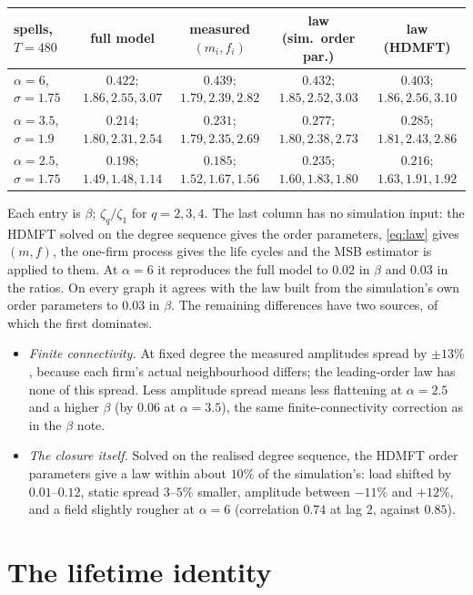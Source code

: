 \documentclass[11pt]{article}
\theoremstyle{remark}
\begin{document}
\begin{center}
\footnotesize\setlength{\tabcolsep}{3pt}
\begin{tabular}{l|c|c|c|c}
\toprule
spells, $T=480$ & full model & measured $(m_i,f_i)$ & law (sim.\ order par.) & law (HDMFT)\\
\midrule
$\alpha=6$, $\sigma=1.75$  & $0.422$; $1.86,2.55,3.07$ & $0.439$; $1.79,2.39,2.82$ & $0.432$; $1.85,2.52,3.03$ & $0.403$; $1.86,2.56,3.10$\\
$\alpha=3.5$, $\sigma=1.9$ & $0.214$; $1.80,2.31,2.54$ & $0.231$; $1.79,2.35,2.69$ & $0.277$; $1.80,2.38,2.73$ & $0.285$; $1.81,2.43,2.86$\\
$\alpha=2.5$, $\sigma=1.75$ & $0.198$; $1.49,1.48,1.14$ & $0.185$; $1.52,1.67,1.56$ & $0.235$; $1.60,1.83,1.80$ & $0.216$; $1.63,1.91,1.92$\\
\bottomrule
\end{tabular}
\end{center}

Each entry is $\beta$; $\zeta_q/\zeta_1$ for $q=2,3,4$.  The last column has no simulation input: the HDMFT solved
on the degree sequence gives the order parameters, \eqref{eq:law} gives $(m,f)$, the one-firm process gives the
life cycles and the MSB estimator is applied to them.  At $\alpha=6$ it reproduces the full model to $0.02$ in
$\beta$ and $0.03$ in the ratios.  On every graph it agrees with the law built from the simulation's own order
parameters to $0.03$ in $\beta$.  The remaining differences have two sources, of which the first dominates.
\begin{itemize}
  \item \emph{Finite connectivity.}  At fixed degree the measured amplitudes spread by $\pm13\%$, because each
        firm's actual neighbourhood differs; the leading-order law has none of this spread.  Less amplitude spread
        means less flattening at $\alpha=2.5$ and a higher $\beta$ (by $0.06$ at $\alpha=3.5$), the same
        finite-connectivity correction as in the $\beta$ note.
  \item \emph{The closure itself.}  Solved on the realised degree sequence, the HDMFT order parameters give a law
        within about $10\%$ of the simulation's: load shifted by $0.01$--$0.12$, static spread $3$--$5\%$ smaller,
        amplitude between $-11\%$ and $+12\%$, and a field slightly rougher at $\alpha=6$ (correlation $0.74$ at
        lag $2$, against $0.85$).
\end{itemize}

\section{The lifetime identity}
\end{document}
